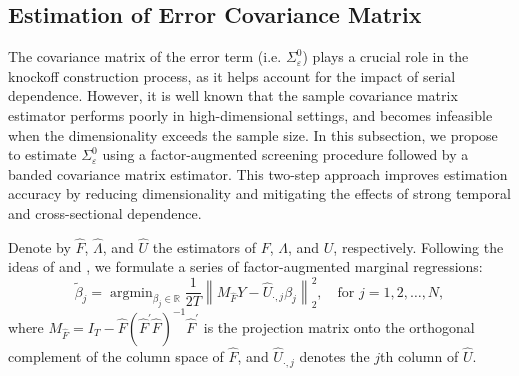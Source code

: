 ﻿\documentclass[12pt]{article}
\newcommand{\0}{\mbox{\bf 0}}
\theoremstyle{plain}%
\theoremstyle{definition}
\begin{document}
\subsection{Estimation of Error Covariance Matrix}
\label{sec:erro_cov}

The covariance matrix of the error term (i.e. $\Sigma_{\varepsilon}^{0}$) plays a crucial role in the knockoff construction process, as it helps account for the impact of serial dependence. However, it is well known that the sample covariance matrix estimator performs poorly in high-dimensional settings, and becomes infeasible when the dimensionality exceeds the sample size. In this subsection, we propose to estimate $\Sigma_{\varepsilon}^{0}$ using a factor-augmented screening procedure followed by a banded covariance matrix estimator. This two-step approach improves estimation accuracy by reducing dimensionality and mitigating the effects of strong temporal and cross-sectional dependence.


Denote by $\widehat{F}$, $\widehat{\Lambda}$, and $\widehat{U}$ the estimators of $F$, $\Lambda$, and $U$, respectively. Following the ideas of \citet{Wang2012} and \citet{FanKeWang2020}, we formulate a series of factor-augmented marginal regressions:
\begin{equation}
\widetilde{\beta}_{j} = \mathop{\arg\min}_{\beta_{j} \in \mathbb{R}} \frac{1}{2T} \left\| M_{\widehat{F}} Y - \widehat{U}_{\cdot,j} \beta_{j} \right\|_2^2, \quad \text{for } j = 1, 2, \ldots, N, \label{eq:aug_marginal}
\end{equation}
where $M_{\widehat{F}} = I_{T} - \widehat{F}(\widehat{F}^{\prime} \widehat{F})^{-1} \widehat{F}^{\prime}$ is the projection matrix onto the orthogonal complement of the column space of $\widehat{F}$, and $\widehat{U}_{\cdot,j}$ denotes the $j$th column of $\widehat{U}$.
\end{document}
